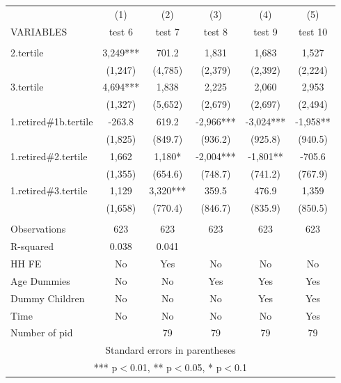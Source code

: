 \begin{tabular}{lccccc} \hline
 & (1) & (2) & (3) & (4) & (5) \\
VARIABLES & test 6 & test 7 & test 8 & test 9 & test 10 \\ \hline
 &  &  &  &  &  \\
2.tertile & 3,249*** & 701.2 & 1,831 & 1,683 & 1,527 \\
 & (1,247) & (4,785) & (2,379) & (2,392) & (2,224) \\
3.tertile & 4,694*** & 1,838 & 2,225 & 2,060 & 2,953 \\
 & (1,327) & (5,652) & (2,679) & (2,697) & (2,494) \\
1.retired\#1b.tertile & -263.8 & 619.2 & -2,966*** & -3,024*** & -1,958** \\
 & (1,825) & (849.7) & (936.2) & (925.8) & (940.5) \\
1.retired\#2.tertile & 1,662 & 1,180* & -2,004*** & -1,801** & -705.6 \\
 & (1,355) & (654.6) & (748.7) & (741.2) & (767.9) \\
1.retired\#3.tertile & 1,129 & 3,320*** & 359.5 & 476.9 & 1,359 \\
 & (1,658) & (770.4) & (846.7) & (835.9) & (850.5) \\
 &  &  &  &  &  \\
Observations & 623 & 623 & 623 & 623 & 623 \\
R-squared & 0.038 & 0.041 &  &  &  \\
HH FE & No & Yes & No & No & No \\
Age Dummies & No & No & Yes & Yes & Yes \\
Dummy Children & No & No & No & Yes & Yes \\
Time & No & No & No & No & Yes \\
 Number of pid &  & 79 & 79 & 79 & 79 \\ \hline
\multicolumn{6}{c}{ Standard errors in parentheses} \\
\multicolumn{6}{c}{ *** p$<$0.01, ** p$<$0.05, * p$<$0.1} \\
\end{tabular}
